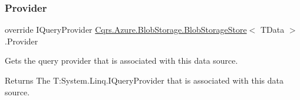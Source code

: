 \subsubsection{\texorpdfstring{Provider}{Provider}}
{\footnotesize\ttfamily override I\+Query\+Provider \hyperlink{classCqrs_1_1Azure_1_1BlobStorage_1_1BlobStorageStore}{Cqrs.\+Azure.\+Blob\+Storage.\+Blob\+Storage\+Store}$<$ T\+Data $>$.Provider\hspace{0.3cm}{\ttfamily [get]}}



Gets the query provider that is associated with this data source. 

\begin{DoxyReturn}{Returns}
The T\+:\+System.\+Linq.\+I\+Query\+Provider that is associated with this data source. 
\end{DoxyReturn}

